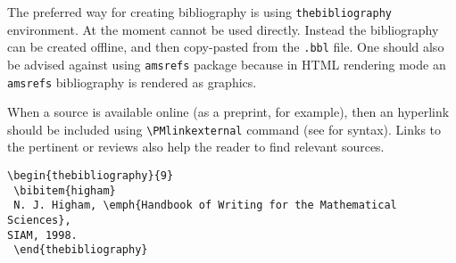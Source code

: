 The preferred way for creating bibliography is using \texttt{thebibliography} environment. At the moment \BibTeX{} cannot be used directly. Instead the bibliography can be created offline, and then copy-pasted from the \texttt{.bbl} file. One should also be advised against using \texttt{amsrefs} package because in HTML rendering mode an \texttt{amsrefs} bibliography is rendered as graphics.

When a source is available online (as a preprint, for example), then an hyperlink should be included using \texttt{\textbackslash{}PMlinkexternal} command (see  for syntax). Links to the pertinent  or  reviews also help the reader to find relevant sources.

\begin{verbatim}
\begin{thebibliography}{9}
 \bibitem{higham}
 N. J. Higham, \emph{Handbook of Writing for the Mathematical Sciences},
SIAM, 1998.
 \end{thebibliography}
\end{verbatim}

